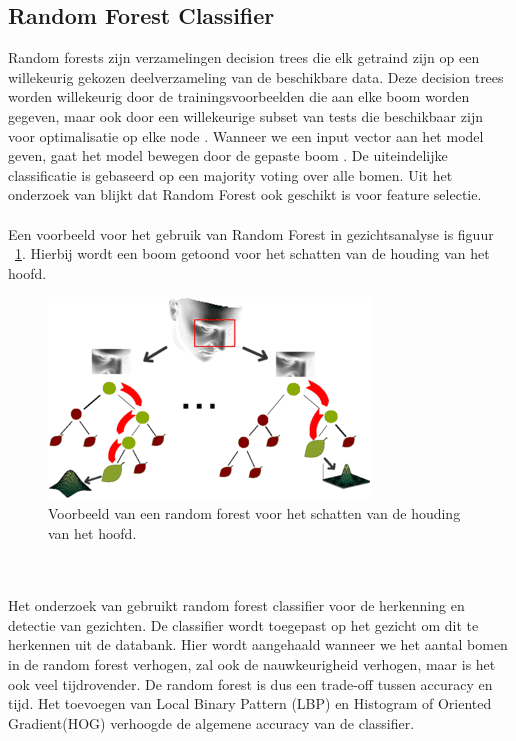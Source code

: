\subsection{Random Forest Classifier}
\label{sub:randomforest}
Random forests zijn verzamelingen decision trees die elk getraind zijn op een willekeurig gekozen deelverzameling van de beschikbare data. Deze decision trees worden willekeurig door de trainingsvoorbeelden die aan elke boom worden gegeven,  maar ook door een willekeurige subset van tests die beschikbaar zijn voor optimalisatie op elke node \autocite{Fanelli2012}. Wanneer we een input vector aan het model geven, gaat het model bewegen door de gepaste boom \autocite{Chen2011}. De uiteindelijke classificatie is gebaseerd op een majority voting over alle bomen. Uit het onderzoek van \textcite{Wang2010} blijkt dat Random Forest ook geschikt is voor feature selectie. \\
\\
Een voorbeeld voor het gebruik van Random Forest in gezichtsanalyse is figuur {~\ref{fig:randomforest}}. Hierbij wordt een boom getoond voor het  schatten van de houding van het hoofd. 
\begin{figure}
    \centering
    \includegraphics{graphics/headposition.png}
    \caption[Random forest voor houding van het hoofd]{Voorbeeld van een random forest voor het schatten van de houding van het hoofd\autocite{Fanelli2012}.
        \label{fig:randomforest}}
\end{figure} \\
\\
Het onderzoek van \textcite{Mady2018} gebruikt random forest classifier voor de herkenning en detectie van gezichten. De classifier wordt toegepast op het gezicht om dit te herkennen uit de databank. Hier wordt aangehaald wanneer we het aantal bomen in de random forest verhogen, zal ook de nauwkeurigheid verhogen, maar is het ook veel tijdrovender. De random forest is dus een trade-off tussen accuracy en tijd. Het toevoegen van Local Binary Pattern (LBP) en Histogram of Oriented Gradient(HOG) verhoogde de algemene accuracy van de classifier. 

